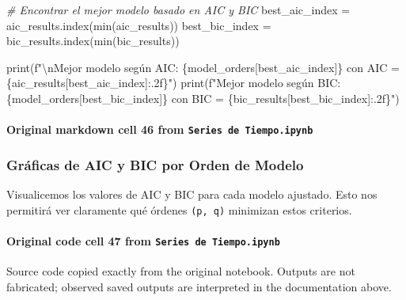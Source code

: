 \documentclass[
  11pt,
]{article}
\newenvironment{Shaded}{}{}
\newcommand{\BuiltInTok}[1]{\textcolor[rgb]{0.00,0.50,0.00}{#1}}
\newcommand{\CharTok}[1]{\textcolor[rgb]{0.25,0.44,0.63}{#1}}
\newcommand{\CommentTok}[1]{\textcolor[rgb]{0.38,0.63,0.69}{\textit{#1}}}
\newcommand{\NormalTok}[1]{#1}
\newcommand{\OperatorTok}[1]{\textcolor[rgb]{0.40,0.40,0.40}{#1}}
\newcommand{\SpecialCharTok}[1]{\textcolor[rgb]{0.25,0.44,0.63}{#1}}
\newcommand{\SpecialStringTok}[1]{\textcolor[rgb]{0.73,0.40,0.53}{#1}}
\begin{document}
\begin{Shaded}
\begin{Highlighting}[]
\CommentTok{\# Encontrar el mejor modelo basado en AIC y BIC}
\NormalTok{best\_aic\_index }\OperatorTok{=}\NormalTok{ aic\_results.index(}\BuiltInTok{min}\NormalTok{(aic\_results))}
\NormalTok{best\_bic\_index }\OperatorTok{=}\NormalTok{ bic\_results.index(}\BuiltInTok{min}\NormalTok{(bic\_results))}

\BuiltInTok{print}\NormalTok{(}\SpecialStringTok{f"}\CharTok{\textbackslash{}n}\SpecialStringTok{Mejor modelo según AIC: }\SpecialCharTok{\{}\NormalTok{model\_orders[best\_aic\_index]}\SpecialCharTok{\}}\SpecialStringTok{ con AIC = }\SpecialCharTok{\{}\NormalTok{aic\_results[best\_aic\_index]}\SpecialCharTok{:.2f\}}\SpecialStringTok{"}\NormalTok{)}
\BuiltInTok{print}\NormalTok{(}\SpecialStringTok{f"Mejor modelo según BIC: }\SpecialCharTok{\{}\NormalTok{model\_orders[best\_bic\_index]}\SpecialCharTok{\}}\SpecialStringTok{ con BIC = }\SpecialCharTok{\{}\NormalTok{bic\_results[best\_bic\_index]}\SpecialCharTok{:.2f\}}\SpecialStringTok{"}\NormalTok{)}
\end{Highlighting}
\end{Shaded}

\paragraph{\texorpdfstring{Original markdown cell 46 from \texttt{Series\ de\ Tiempo.ipynb}}{Original markdown cell 46 from Series de Tiempo.ipynb}}\label{original-markdown-cell-46-from-series-de-tiempoipynb}

\subsubsection{Gráficas de AIC y BIC por Orden de Modelo}\label{gruxe1ficas-de-aic-y-bic-por-orden-de-modelo}

Visualicemos los valores de AIC y BIC para cada modelo ajustado. Esto nos permitirá ver claramente qué órdenes \texttt{(p,\ q)} minimizan estos criterios.

\paragraph{\texorpdfstring{Original code cell 47 from \texttt{Series\ de\ Tiempo.ipynb}}{Original code cell 47 from Series de Tiempo.ipynb}}\label{original-code-cell-47-from-series-de-tiempoipynb}

Source code copied exactly from the original notebook. Outputs are not fabricated; observed saved outputs are interpreted in the documentation above.
\end{document}
